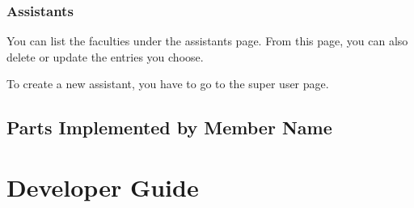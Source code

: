 \documentclass[letterpaper,10pt,english]{sphinxmanual}
\begin{document}
\begin{figure}[htbp]
\centering

\noindent{}
\end{figure}

\begin{figure}[htbp]
\centering

\noindent{}
\end{figure}

\begin{figure}[htbp]
\centering

\noindent{}
\end{figure}


\subsection{Assistants}
\label{\detokenize{user/kaplan:assistants}}
You can list the faculties under the assistants page. From this page, you can also delete or update
the entries you choose.

To create a new assistant, you have to go to the super user page.

\begin{figure}[htbp]
\centering

\noindent{}
\end{figure}

\begin{figure}[htbp]
\centering

\noindent{}
\end{figure}

\begin{figure}[htbp]
\centering

\noindent{}
\end{figure}


\section{Parts Implemented by Member Name}
\label{\detokenize{user/member3:parts-implemented-by-member-name}}\label{\detokenize{user/member3::doc}}

\chapter{Developer Guide}
\label{\detokenize{developer/index:developer-guide}}\label{\detokenize{developer/index::doc}}
\end{document}
